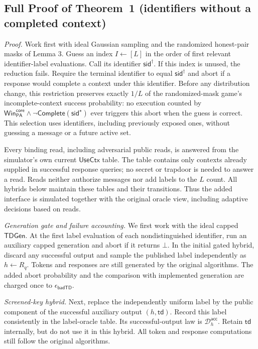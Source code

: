\documentclass[lettersize,journal]{IEEEtran}
\begin{document}
\subsection{Full Proof of Theorem~1 (identifiers without a completed context)}
\label{app:talon-theorem1-proof}

\emph{Proof.}
Work first with ideal Gaussian sampling and the randomized honest-pair
masks of Lemma 3. Guess an index $I\leftarrow[L]$ in the order of first
relevant identifier-label evaluations. Call its identifier
$\mathsf{sid}^{\dagger}$. If this index is unused, the reduction fails.
Require the terminal identifier to equal $\mathsf{sid}^{\dagger}$ and abort
if a response would complete a context under this identifier. Before any
distribution change, this restriction preserves exactly
$1/L$ of the randomized-mask game's
incomplete-context success probability: no execution counted by
$\mathsf{Win}_{\mathsf{PA}}^{\mathsf{core}}
\wedge\neg\mathsf{Complete}(\mathsf{sid}^{\star})$
ever triggers this abort when the guess is correct. This selection
uses identifiers, including previously exposed ones, without guessing a
message or a future active set.

Every binding read, including adversarial public reads, is answered from
the simulator's own current $\mathsf{UseCtx}$ table. The table contains
only contexts already supplied in successful response queries; no secret
or trapdoor is needed to answer a read. Reads neither authorize messages
nor add labels to the $L$ count. All hybrids below maintain these tables
and their transitions. Thus the added interface is simulated together with
the original oracle view, including adaptive decisions based on reads.

\emph{Generation gate and failure accounting.}
We first work with the ideal capped $\mathsf{TDGen}$.
At the first label evaluation of each nondistinguished identifier,
run an auxiliary capped generation and abort if it returns $\bot$.
In the initial gated hybrid, discard any successful output and
sample the published label independently as $h\leftarrow R_q$.
Tokens and responses are still generated by the original algorithms.
The added abort probability and the comparison with implemented
generation are charged once to $\epsilon_{\mathsf{badTD}}$.

\emph{Screened-key hybrid.}
Next, replace the independently uniform label by the public component
of the successful auxiliary output $(h,\mathsf{td})$.
Record this label consistently in the label-oracle table.
Its successful-output law is $\mathcal D_h^{\mathsf{acc}}$.
Retain $\mathsf{td}$ internally, but do not use it in this hybrid.
All token and response computations still follow the original algorithms.
\end{document}
